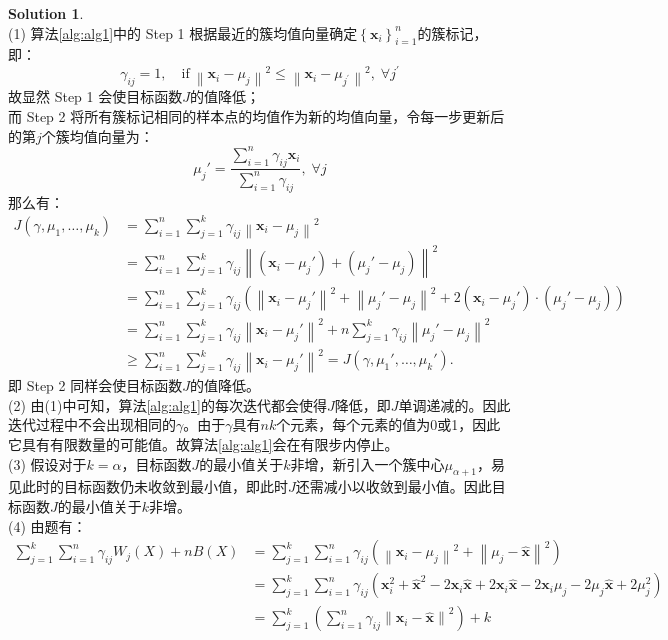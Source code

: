 \documentclass[a4paper,UTF8]{article}
\theoremstyle{definition}
\newtheorem*{solution}{Solution}
\begin{document}
\begin{solution}
~\\(1) 算法\ref{alg:alg1}中的 Step 1 根据最近的簇均值向量确定$\left\{\mathbf{x}_{i}\right\}_{i=1}^{n}$的簇标记，即：$$\gamma_{i j}=1,\quad \text{if}\ \left\|\mathbf{x}_{i}-\mu_{j}\right\|^{2} \leq\left\|\mathbf{x}_{i}-\mu_{j^{\prime}}\right\|^{2},\; \forall j^{\prime}$$
故显然 Step 1 会使目标函数$J$的值降低；\\而 Step 2 将所有簇标记相同的样本点的均值作为新的均值向量，令每一步更新后的第$j$个簇均值向量为：$$\mu_j'=\frac{\sum_{i=1}^{n} \gamma_{i j} \mathbf{x}_{i}}{\sum_{i=1}^{n} \gamma_{i j}},\; \forall j$$那么有：
\begin{equation}\nonumber
\begin{aligned}
J\left(\gamma, \mu_{1}, \ldots, \mu_{k}\right)&=\sum_{i=1}^{n} \sum_{j=1}^{k} \gamma_{i j}\left\|\mathbf{x}_{i}-\mu_{j}\right\|^{2}\\&=\sum_{i=1}^{n} \sum_{j=1}^{k} \gamma_{i j}\left\|(\mathbf{x}_{i}-\mu_{j}')+(\mu_{j}'-\mu_{j})\right\|^{2}\\&=\sum_{i=1}^{n} \sum_{j=1}^{k} \gamma_{i j}\left(\left\|\mathbf{x}_{i}-\mu_{j}'\right\|^{2}+\left\|\mu_{j}'-\mu_{j}\right\|^{2}+2(\mathbf{x}_{i}-\mu_{j}')\cdot(\mu_{j}'-\mu_{j})\right)\\&=\sum_{i=1}^{n} \sum_{j=1}^{k} \gamma_{i j}\left\|\mathbf{x}_{i}-\mu_{j}'\right\|^{2}+n\sum_{j=1}^{k}\gamma_{i j}\left\|\mu_{j}'-\mu_{j}\right\|^{2}\\&\geqslant\sum_{i=1}^{n} \sum_{j=1}^{k} \gamma_{i j}\left\|\mathbf{x}_{i}-\mu_{j}'\right\|^{2}=J\left(\gamma, \mu_{1}', \ldots, \mu_{k}'\right).
\end{aligned}
\end{equation}
即 Step 2 同样会使目标函数$J$的值降低。
 \\(2) 由(1)中可知，算法\ref{alg:alg1}的每次迭代都会使得$J$降低，即$J$单调递减的。因此迭代过程中不会出现相同的$\gamma$。由于$\gamma$具有$nk$个元素，每个元素的值为0或1，因此它具有有限数量的可能值。故算法\ref{alg:alg1}会在有限步内停止。
 \\(3) 假设对于$k=\alpha$，目标函数$J$的最小值关于$k$非增，新引入一个簇中心$\mu_{\alpha+1}$，易见此时的目标函数仍未收敛到最小值，即此时$J$还需减小以收敛到最小值。因此目标函数$J$的最小值关于$k$非增。
 \\(4) 由题有： 
 	\begin{align*}
 	\sum_{j=1}^{k}\sum_{i=1}^{n}\gamma_{i j}W_j(X)+nB(X)&=\sum_{j=1}^{k}\sum_{i=1}^{n}\gamma_{i j}\left(\left\|\mathbf{x}_{i}-\mu_{j}\right\|^{2}+\left\|\mu_{j}-\hat{\mathbf{x}}\right\|^{2}\right)\\&=\sum_{j=1}^{k}\sum_{i=1}^{n}\gamma_{i j}\left(\mathbf{x}_i^2+\hat{\mathbf{x}}^2-2\mathbf{x}_i\hat{\mathbf{x}}+2\mathbf{x}_i\hat{\mathbf{x}}-2\mathbf{x}_i\mu_{j}-2\mu_{j}\hat{\mathbf{x}}+2\mu_{j}^2\right)\\&=\sum_{j=1}^{k}\left(\sum_{i=1}^{n}\gamma_{i j}\left\|\mathbf{x}_{i}-\hat{\mathbf{x}}\right\|^{2}\right)+k

\end{align*}
\end{solution}
\end{document}
